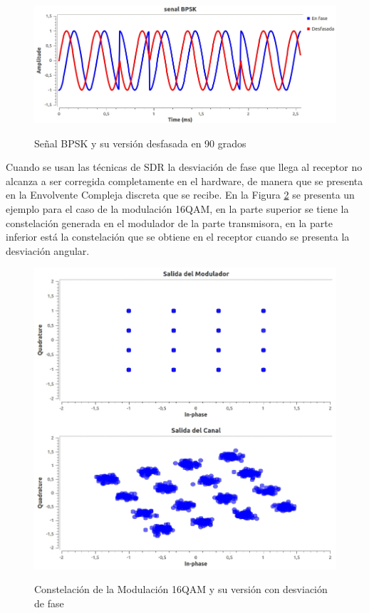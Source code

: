 \begin{figure}[h!]
	\captionsetup{justification = raggedright, singlelinecheck = false}
	\caption{Señal BPSK y su versión desfasada en 90 grados} 
	\centering
	\includegraphics[scale=0.45]{Imagenes/bpsk_desfasadas90.jpg}
	\label{fig:bpsk_desfasadas90}
\end{figure}

Cuando se usan las técnicas de SDR la desviación de fase que llega al receptor no alcanza a ser corregida completamente en el hardware, de manera que se presenta en la Envolvente Compleja discreta que se recibe. En la Figura \ref{fig:16qam_desfasadas} se presenta un ejemplo para el caso de la modulación 16QAM, en la parte superior se tiene la constelación generada en el modulador de la parte transmisora, en la parte inferior está la constelación que se obtiene en el receptor cuando se presenta la desviación angular.\\
\begin{figure}[h!]
	\captionsetup{justification = raggedright, singlelinecheck = false}
	\caption{Constelación de la Modulación 16QAM y su versión con desviación de fase} 
	\centering
	\includegraphics[scale=0.45]{Imagenes/16qam_desfasadas.jpg}
	\label{fig:16qam_desfasadas}
\end{figure}

